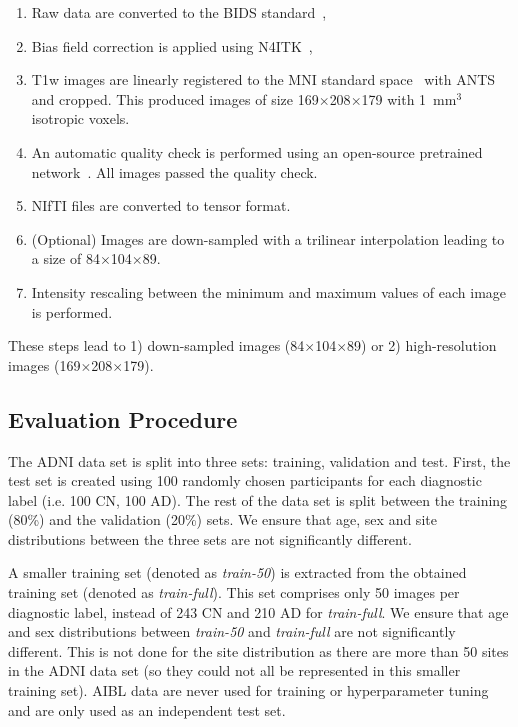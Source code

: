 \documentclass[10pt,journal,compsoc]{IEEEtran}
\begin{document}
\begin{enumerate}
    \item Raw data are converted to the BIDS standard~\cite{gorgolewski_brain_2016},
    \item Bias field correction is applied using N4ITK~\cite{tustison_n4itk_2010},
    \item T1w images are linearly registered to the MNI standard space~\cite{fonov_unbiased_2009, fonov_unbiased_2011} with ANTS~\cite{avants_insight_2014} and cropped. This produced images of size 169$\times$208$\times$179 with 1~mm$^3$ isotropic voxels.
    \item An automatic quality check is performed using an open-source pretrained network~\cite{fonov_deep_2018}. All images passed the quality check.
    \item NIfTI files are converted to tensor format.
    \item (Optional) Images are down-sampled with a trilinear interpolation leading to a size of 84$\times$104$\times$89.
    \item Intensity rescaling between the minimum and maximum values of each image is performed. 
\end{enumerate}
These steps lead to 1) down-sampled images (84$\times$104$\times$89) or 2) high-resolution images (169$\times$208$\times$179).

\subsection{Evaluation Procedure}

The ADNI data set is split into three sets: training, validation and test.
First, the test set is created using 100 randomly chosen participants for each diagnostic label (i.e. 100 CN, 100 AD). The rest of the data set is split between the training (80\%) and the validation (20\%) sets. We ensure that age, sex and site distributions between the three sets are not significantly different.

A smaller training set (denoted as \textit{train-50}) is extracted from the obtained training set (denoted as \textit{train-full}). This set comprises only 50 images per diagnostic label, instead of 243 CN and 210 AD for \textit{train-full}. We ensure that age and sex distributions between \textit{train-50} and \textit{train-full} are not significantly different. This is not done for the site distribution as there are more than 50 sites in the ADNI data set (so they could not all be represented in this smaller training set). AIBL data are never used for training or hyperparameter tuning and are only used as an independent test set.
\end{document}
